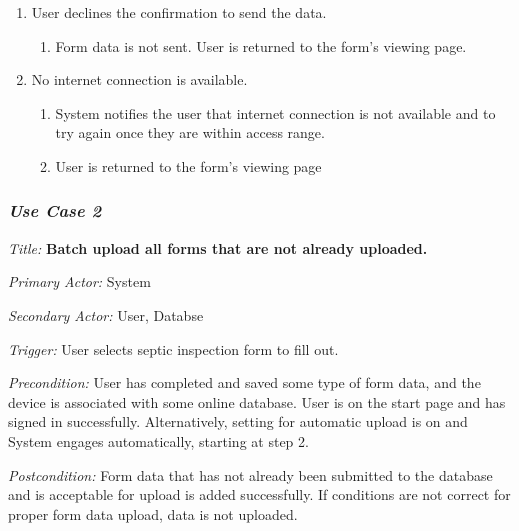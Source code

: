 \documentclass[twoside,letterpaper]{article}
\begin{document}
\begin{enumerate}
\item User declines the confirmation to send the data.
\begin{enumerate}
\item Form data is not sent. User is returned to the form's viewing page.
\end{enumerate}

\item No internet connection is available.
\begin{enumerate}
\item System notifies the user that internet connection is not available and to try again once they are within access range.
\item User is returned to the form's viewing page
\end{enumerate}
\end{enumerate}

\subsubsection{\textit{Use Case 2}}

\textit{Title: }{\bfseries\color{black}Batch upload all forms that are not already uploaded.}

{\color{black} \textit{Primary Actor:} System}

{\color{black} \textit{Secondary Actor:} User, Databse}

{\color{black} \textit{Trigger:} User selects septic inspection form to fill out.}

{\color{black} \textit{Precondition:}  User has completed and saved some type of form data, and the device is associated with some online database. User is on the start page and has signed in successfully. Alternatively, setting for automatic upload is on and System engages automatically, starting at step 2.}

{\color{black} \textit{Postcondition:} Form data that has not already been submitted to the database and is acceptable for upload is added successfully. If conditions are not correct for proper form data upload, data is not uploaded.}
\end{document}
